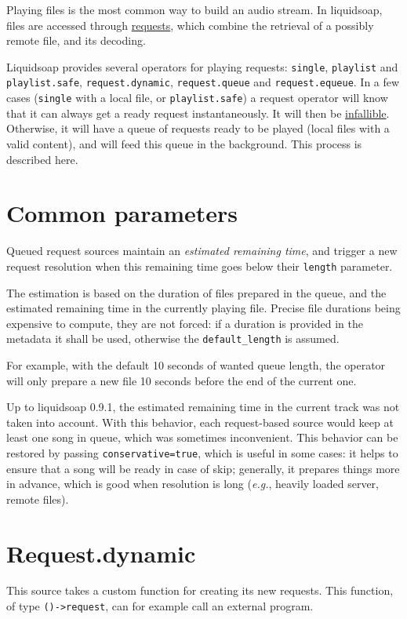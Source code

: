Playing files is the most common way to build an audio stream.
In liquidsoap, files are accessed through \href{requests.html}{requests},
which combine the retrieval of a possibly remote file, and its
decoding.

Liquidsoap provides several operators for playing requests:
\verb+single+, \verb+playlist+ and \verb+playlist.safe+,
\verb+request.dynamic+, \verb+request.queue+ and \verb+request.equeue+.
In a few cases (\verb+single+ with a local file,
or \verb+playlist.safe+) a request operator will know
that it can always get a ready request instantaneously.
It will then be \href{sources.html}{infallible}.
Otherwise, it will have a queue of requests ready
to be played (local files with a valid content), and will
feed this queue in the background.
This process is described here.

\section{Common parameters}
Queued request sources maintain an \emph{estimated remaining time},
and trigger a new request resolution when this remaining time
goes below their \verb+length+ parameter.

The estimation is based on the duration of files prepared in the queue,
and the estimated remaining time in the currently playing file.
Precise file durations being expensive to compute, they are not
forced: if a duration is provided in the metadata it shall be used,
otherwise the \verb+default_length+ is assumed.

For example, with the default 10 seconds of wanted queue length,
the operator will only prepare a new file 10 seconds before
the end of the current one.

Up to liquidsoap 0.9.1, the estimated remaining time
in the current track was not taken into account.
With this behavior, each request-based source would keep at least
one song in queue, which was sometimes inconvenient.
This behavior can be restored by passing \verb+conservative=true+,
which is useful in some cases:
it helps to ensure that a song will be ready in case of skip;
generally, it prepares things more in advance, which is good when
resolution is long (\emph{e.g.}, heavily loaded server, remote files).

\section{Request.dynamic}
This source takes a custom function for creating its new requests.
This function, of type \verb+()->request+,
can for example call an external program.

